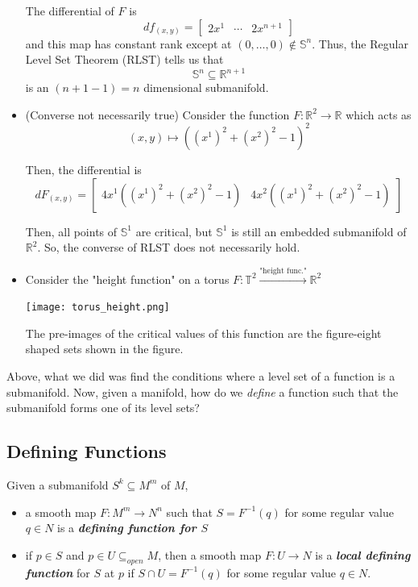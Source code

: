 \documentclass{article}
\newcommand{\R}{\mathbb{R}}
\begin{document}
\begin{itemize}
  \vskip 0.5cm
  The differential of $F$ is 
  \[ df_{(x, y)} = \begin{bmatrix}
    2x^1 & \cdots & 2x^{n+1}
  \end{bmatrix}  \]
  and this map has constant rank except at $(0, \dots, 0) \not\in \mathbb{S}^n$. Thus, the Regular Level Set Theorem (RLST) tells us that 
  \[ \mathbb{S}^n \subseteq \mathbb{R}^{n+1} \] is an $(n+1-1) = n$ dimensional submanifold.

  \vskip 0.5cm
  \item (Converse not necessarily true) Consider the function $F : \R^2 \rightarrow \R$ which acts as 
  \[ (x, y) \mapsto \left( (x^1)^2  + (x^2)^2 - 1 \right)^2 \]

  Then, the differential is 
  \[ dF_{(x, y)} = \begin{bmatrix}
    4x^1\left( (x^1)^2 + (x^2)^2 - 1 \right) & 4x^2\left( (x^1)^2 + (x^2)^2 - 1 \right)
  \end{bmatrix} \]

  Then, all points of $\mathbb{S}^1$ are critical, but $\mathbb{S}^1$ is still an embedded submanifold of $\R^2$. So, the converse of RLST does not necessarily hold.

  \vskip 0.5cm
  \item Consider the "height function" on a torus $F : \mathbb{T}^2 \xrightarrow{\text{"height func."}} \R^2$
  \begin{center}
    \texttt{[image: torus\_height.png]}
  \end{center}

  The pre-images of the critical values of this function are the figure-eight shaped sets shown in the figure.
\end{itemize}

\vskip 0.5cm
Above, what we did was find the conditions where a level set of a function is a submanifold. Now, given a manifold, how do we \emph{define} a function such that the submanifold forms one of its level sets?

\vskip 1cm
\subsection{Defining Functions}


\begin{mathdefinitionbox}{}
  Given a submanifold $S^k \subseteq M^m$ of $M$, 
  \begin{itemize}
    \item a smooth map $F : M^m \rightarrow N^n$ such that $S = F^{-1}(q)$ for some regular value $q \in N$ is a \emph{\textbf{defining function for $S$}} 
    \item if $p \in S$ and $p \in U \subseteq_{open} M$, then a smooth map $F : U \rightarrow N$ is a \emph{\textbf{local defining function}} for $S$ at $p$ if $S \cap U = F^{-1}(q)$ for some regular value $q \in N$.
  \end{itemize}
\end{mathdefinitionbox}
\end{document}
